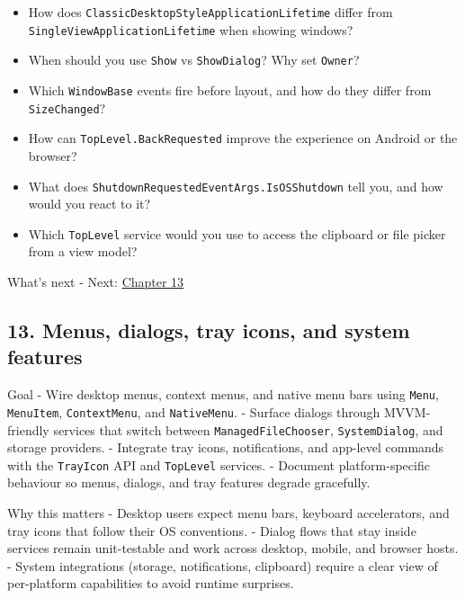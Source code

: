 \begin{itemize}
\tightlist
\item
  How does
  \passthrough{\lstinline!ClassicDesktopStyleApplicationLifetime!}
  differ from \passthrough{\lstinline!SingleViewApplicationLifetime!}
  when showing windows?
\item
  When should you use \passthrough{\lstinline!Show!} vs
  \passthrough{\lstinline!ShowDialog!}? Why set
  \passthrough{\lstinline!Owner!}?
\item
  Which \passthrough{\lstinline!WindowBase!} events fire before layout,
  and how do they differ from \passthrough{\lstinline!SizeChanged!}?
\item
  How can \passthrough{\lstinline!TopLevel.BackRequested!} improve the
  experience on Android or the browser?
\item
  What does
  \passthrough{\lstinline!ShutdownRequestedEventArgs.IsOSShutdown!} tell
  you, and how would you react to it?
\item
  Which \passthrough{\lstinline!TopLevel!} service would you use to
  access the clipboard or file picker from a view model?
\end{itemize}

What's next - Next: \href{Chapter13.md}{Chapter 13}

\newpage

\subsection{13. Menus, dialogs, tray icons, and system
features}\label{menus-dialogs-tray-icons-and-system-features}

Goal - Wire desktop menus, context menus, and native menu bars using
\passthrough{\lstinline!Menu!}, \passthrough{\lstinline!MenuItem!},
\passthrough{\lstinline!ContextMenu!}, and
\passthrough{\lstinline!NativeMenu!}. - Surface dialogs through
MVVM-friendly services that switch between
\passthrough{\lstinline!ManagedFileChooser!},
\passthrough{\lstinline!SystemDialog!}, and storage providers. -
Integrate tray icons, notifications, and app-level commands with the
\passthrough{\lstinline!TrayIcon!} API and
\passthrough{\lstinline!TopLevel!} services. - Document
platform-specific behaviour so menus, dialogs, and tray features degrade
gracefully.

Why this matters - Desktop users expect menu bars, keyboard
accelerators, and tray icons that follow their OS conventions. - Dialog
flows that stay inside services remain unit-testable and work across
desktop, mobile, and browser hosts. - System integrations (storage,
notifications, clipboard) require a clear view of per-platform
capabilities to avoid runtime surprises.

